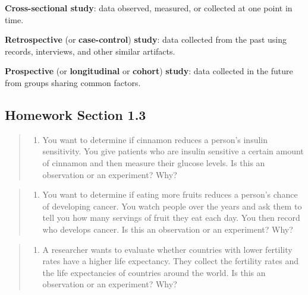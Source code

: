 \documentclass[]{book}
\providecommand{\tightlist}{%
  \setlength{\itemsep}{0pt}\setlength{\parskip}{0pt}}
\begin{document}
\textbf{Cross-sectional study}: data observed, measured, or collected at one point in time.

\textbf{Retrospective} (or \textbf{case-control}) \textbf{study}: data collected from the past using records, interviews, and other similar artifacts.

\textbf{Prospective} (or \textbf{longitudinal} or \textbf{cohort}) \textbf{study}: data collected in the future from groups sharing common factors.

\hypertarget{homework-section-1.3}{%
\subsection{Homework Section 1.3}\label{homework-section-1.3}}

\begin{quote}
\begin{enumerate}
\def\labelenumi{\arabic{enumi}.}
\tightlist
\item
  You want to determine if cinnamon reduces a person's insulin sensitivity. You give patients who are insulin sensitive a certain amount of cinnamon and then measure their glucose levels. Is this an observation or an experiment? Why?
\end{enumerate}
\end{quote}

\begin{quote}
\begin{enumerate}
\def\labelenumi{\arabic{enumi}.}
\setcounter{enumi}{1}
\tightlist
\item
  You want to determine if eating more fruits reduces a person's chance of developing cancer. You watch people over the years and ask them to tell you how many servings of fruit they eat each day. You then record who develops cancer. Is this an observation or an experiment? Why?
\end{enumerate}
\end{quote}

\begin{quote}
\begin{enumerate}
\def\labelenumi{\arabic{enumi}.}
\setcounter{enumi}{2}
\tightlist
\item
  A researcher wants to evaluate whether countries with lower fertility rates have a higher life expectancy. They collect the fertility rates and the life expectancies of countries around the world. Is this an observation or an experiment? Why?
\end{enumerate}
\end{quote}
\end{document}
